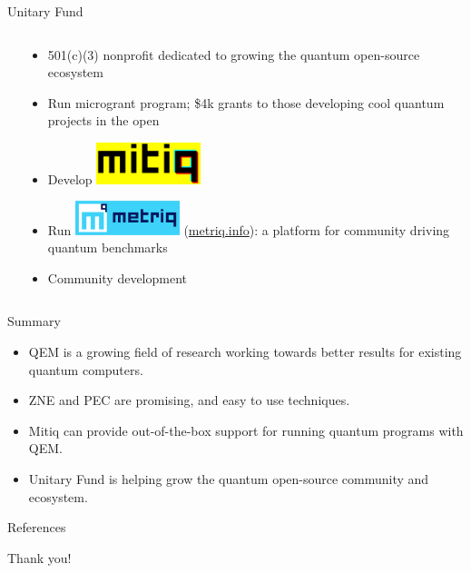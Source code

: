 \documentclass[11pt,aspectratio=1610,xcolor=dvipsnames]{beamer}
\begin{document}
\begin{frame}{Unitary Fund}
\begin{columns}
\begin{column}{0.5\textwidth}
		\end{column}
		\begin{column}{0.5\textwidth}
			\begin{itemize}
				\item 501(c)(3) nonprofit dedicated to growing the quantum open-source ecosystem
				\item \alert<2>{Run microgrant program; \$4k grants to those developing cool quantum projects in the open}
				\item Develop \includegraphics[width=0.25\textwidth]{mitiq-logo.png}
				\item \alert<3>{Run \includegraphics[width=0.25\textwidth]{metriq-logo.png} (\url{metriq.info}): a platform for community driving quantum benchmarks}
				\item \alert<4>{Community development}
			\end{itemize}
		\end{column}
	\end{columns}
\end{frame}


\begin{frame}{Summary}
	\begin{itemize}
		\item QEM is a growing field of research working towards better results for existing quantum computers.
		\item ZNE and PEC are promising, and easy to use techniques.
		\item Mitiq can provide out-of-the-box support for running quantum programs with QEM.
		\item Unitary Fund is helping grow the quantum open-source community and ecosystem.
	\end{itemize}
\end{frame}

\begin{frame}{References}
	\nocite{*}
	\printbibliography[heading=none]
\end{frame}

\begin{frame}[standout]
	Thank you!
\end{frame}
\end{document}
